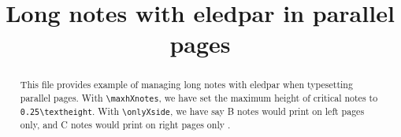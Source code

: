 \documentclass{article}
\begin{document}
\date{}
\begin{english}
\title{Long notes with eledpar in parallel pages}
\maketitle
\begin{abstract}
This file provides example of managing long notes with eledpar when typesetting parallel pages.
With \verb+\maxhXnotes+, we have set the maximum height of critical notes to \verb+0.25\textheight+. With \verb+\onlyXside+, we have say B notes would  print  on left pages only, and C notes would  print on right pages only .
\end{abstract}

\end{english}
\end{document}
